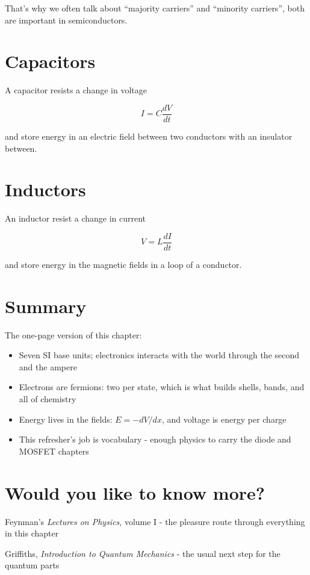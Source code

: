 That's why we often talk about ``majority carriers'' and ``minority
carriers'', both are important in semiconductors.

\section{Capacitors}\label{capacitors}

A capacitor resists a change in voltage

\[ I = C \frac{dV}{dt}\]

and store energy in an electric field between two conductors with an
insulator between.

\section{Inductors}\label{inductors}

An inductor resist a change in current

\[ V = L \frac{dI}{dt}\]

and store energy in the magnetic fields in a loop of a conductor.

\section{Summary}\label{summary}

The one-page version of this chapter:

\begin{itemize}
\tightlist
\item
  Seven SI base units; electronics interacts with the world through the
  second and the ampere
\item
  Electrons are fermions: two per state, which is what builds shells,
  bands, and all of chemistry
\item
  Energy lives in the fields: \(E = -dV/dx\), and voltage is energy per
  charge
\item
  This refresher's job is vocabulary - enough physics to carry the diode
  and MOSFET chapters
\end{itemize}

\section{Would you like to know
more?}\label{would-you-like-to-know-more}

Feynman's \emph{Lectures on Physics}, volume I - the pleasure route
through everything in this chapter

Griffiths, \emph{Introduction to Quantum Mechanics} - the usual next
step for the quantum parts
